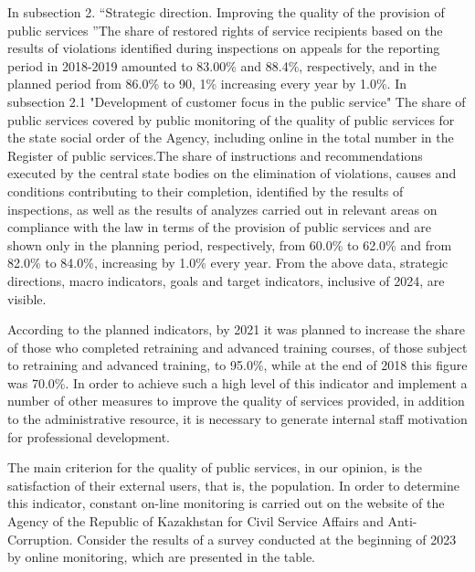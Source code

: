 \begin{multicols}{2}
In subsection 2. ``Strategic direction. Improving the quality of the
provision of public services ''The share of restored rights of service
recipients based on the results of violations identified during
inspections on appeals for the reporting period in 2018-2019 amounted to
83.00\% and 88.4\%, respectively, and in the planned period from 86.0\%
to 90, 1\% increasing every year by 1.0\%. In subsection 2.1
"Development of customer focus in the public service" The share of
public services covered by public monitoring of the quality of public
services for the state social order of the Agency, including online in
the total number in the Register of public services.The share of
instructions and recommendations executed by the central state bodies on
the elimination of violations, causes and conditions contributing to
their completion, identified by the results of inspections, as well as
the results of analyzes carried out in relevant areas on compliance with
the law in terms of the provision of public services and are shown only
in the planning period, respectively, from 60.0\% to 62.0\% and from
82.0\% to 84.0\%, increasing by 1.0\% every year. From the above data,
strategic directions, macro indicators, goals and target indicators,
inclusive of 2024, are visible.

According to the planned indicators, by 2021 it was planned to increase
the share of those who completed retraining and advanced training
courses, of those subject to retraining and advanced training, to
95.0\%, while at the end of 2018 this figure was 70.0\%. In order to
achieve such a high level of this indicator and implement a number of
other measures to improve the quality of services provided, in addition
to the administrative resource, it is necessary to generate internal
staff motivation for professional development.

The main criterion for the quality of public services, in our opinion,
is the satisfaction of their external users, that is, the population. In
order to determine this indicator, constant on-line monitoring is
carried out on the website of the Agency of the Republic of Kazakhstan
for Civil Service Affairs and Anti-Corruption. Consider the results of a
survey conducted at the beginning of 2023 by online monitoring, which
are presented in the table.
\end{multicols}

